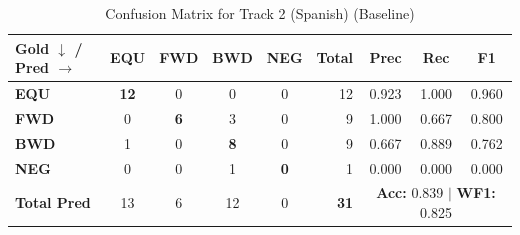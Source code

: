 \begin{table}[ht]
\centering
\small
\begin{tabular}{l|cccc|r|ccc}
\toprule
\textbf{Gold $\downarrow$ / Pred $\rightarrow$} & \textbf{EQU} & \textbf{FWD} & \textbf{BWD} & \textbf{NEG} & \textbf{Total} & \textbf{Prec} & \textbf{Rec} & \textbf{F1} \\
\midrule
\textbf{EQU} & \textbf{12} & 0 & 0 & 0 & 12 & 0.923 & 1.000 & 0.960 \\
\textbf{FWD} & 0 & \textbf{6} & 3 & 0 & 9 & 1.000 & 0.667 & 0.800 \\
\textbf{BWD} & 1 & 0 & \textbf{8} & 0 & 9 & 0.667 & 0.889 & 0.762 \\
\textbf{NEG} & 0 & 0 & 1 & \textbf{0} & 1 & 0.000 & 0.000 & 0.000 \\
\midrule
\textbf{Total Pred} & 13 & 6 & 12 & 0 & \textbf{31} & \multicolumn{3}{c}{\textbf{Acc:} 0.839 $\mid$ \textbf{WF1:} 0.825} \\
\bottomrule
\end{tabular}
\caption{Confusion Matrix for Track 2 (Spanish) (Baseline)}
\label{tab:confusion_matrix}
\end{table}
